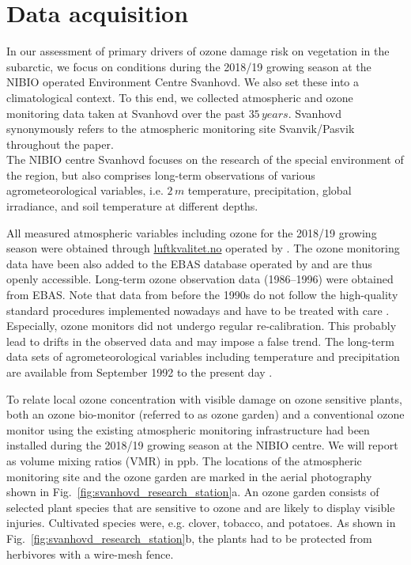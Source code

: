 \documentclass[bg, manuscript]{copernicus}
\begin{document}
\section{Data acquisition}
\label{sec:data}

In our assessment of primary drivers of ozone damage risk on vegetation in the subarctic, we focus on conditions during the 2018/19 growing season at the NIBIO operated Environment Centre Svanhovd. We also set these into a climatological context. To this end, we collected atmospheric and ozone monitoring data taken at Svanhovd over the past $35\,\unit{years}$. Svanhovd synonymously refers to the atmospheric monitoring site Svanvik/Pasvik throughout the paper.\\

The NIBIO centre Svanhovd focuses on the research of the special environment of the region, but also comprises long-term observations of various agrometeorological variables, i.e. $2\,\unit{m}$ temperature, precipitation, global irradiance, and soil temperature at different depths.

All measured atmospheric variables including ozone for the 2018/19 growing season were obtained through \href{luftkvalitet.no}{luftkvalitet.no} operated by \citet{NILU_AIRQ}. The ozone monitoring data have been also added to the EBAS database operated by \citet{NILU_EBAS} and are thus openly accessible. Long-term ozone observation data (1986--1996) were obtained from EBAS. Note that data from before the 1990s do not follow the high-quality standard procedures implemented nowadays and have to be treated with care \citep{NILU2003}. Especially, ozone monitors did not undergo regular re-calibration. This probably lead to drifts in the observed data and may impose a false trend.
The long-term data sets of agrometeorological variables including temperature and precipitation are available from September 1992 to the present day \citep[LandbruksMeteorologiske Tjeneste][note the station name here is Pasvik]{LMT_NIBIO}.

To relate local ozone concentration \chem{[O_3]} with visible damage on ozone sensitive plants, both an ozone bio-monitor (referred to as ozone garden) and a conventional ozone monitor using the existing atmospheric monitoring infrastructure had been installed during the 2018/19 growing season at the NIBIO centre. We will report \chem{[O_3]} as volume mixing ratios (VMR) in \unit{ppb}. The locations of the atmospheric monitoring site and the ozone garden are marked in the aerial photography shown in Fig.~\ref{fig:svanhovd_research_station}a. An ozone garden consists of selected plant species that are sensitive to ozone and are likely to display visible injuries. Cultivated species were, e.g. clover, tobacco, and potatoes. As shown in Fig.~\ref{fig:svanhovd_research_station}b, the plants had to be protected from herbivores with a wire-mesh fence.
\end{document}
